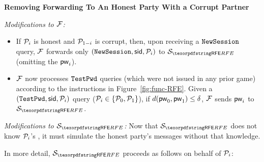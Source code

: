 \begin{games}
\textbf{Removing \Password Forwarding To An Honest Party With a Corrupt Partner}

\textit{Modifications to $\mathcal{F}$:}
\begin{itemize}
\item
If $\mathcal{P}_{i}$ is honest and $\mathcal{P}_{1-i}$ is corrupt, then, upon receiving a $\texttt{NewSession}$ query, $\mathcal{F}$ forwards only $(\texttt{NewSession}, \allowbreak \mathsf{sid}, \mathcal{P}_{i})$ to $\SimYGCRFE$ (omitting the \password $\mathsf{pw}_{i}$).
\item
$\mathcal{F}$ now processes $\texttt{TestPwd}$ queries (which were not issued in any prior game) according to the instructions in Figure~\ref{fig:func-RFE}. 
Given a $(\texttt{TestPwd}, \mathsf{sid}, \mathcal{P}_{i})$ query ($\mathcal{P}_{i} \in \{\mathcal{P}_{0}, \mathcal{P}_{1}\}$),
if $d(\mathsf{pw}_{0}, \mathsf{pw}_{1}) \leq \delta$, $\mathcal{F}$ sends $\mathsf{pw}_{i}$ to $\SimYGCRFE$.
\end{itemize}

\textit{Modifications to $\SimYGCRFE$:}
Now that $\SimYGCRFE$ does not know $\mathcal{P}_{i}$'s \password, it must simulate the honest party's messages without that knowledge.

In more detail, $\SimYGCRFE$ proceeds as follows on behalf of $\mathcal{P}_{i}$:


\end{games}
